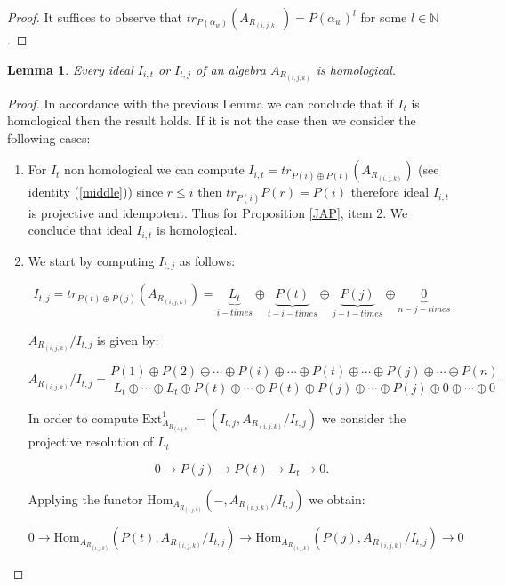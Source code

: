 \documentclass[10pt,twoside]{article}
\newtheorem{lema}{Lemma}
\theoremstyle{definition}
\begin{document}
\begin{proof}
It suffices to observe that $tr_{P(\alpha_w)}(A_{R_{(i, j, k)}})=P(\alpha_w)^{l}$ for some $l\in \mathbb{N}$.
\end{proof}



\begin{lema}\label{18}
Every ideal $I_{i, t}$ or $I_{t, j}$ of an algebra $A_{R_{(i, j, k)}}$ is homological.
\end{lema}

\begin{proof}
In accordance with the previous Lemma we can conclude that if $I_t$ is homological then the result holds. If it is not the case then we consider the following cases:

\begin{enumerate}
\item For $I_{t}$ non homological we can compute  $I_{i,t}= tr_{P(i)\oplus P(t)}(A_{R_{(i, j, k)}})$ (see identity (\ref{middle})) since  $r\leq i$ then $tr_{P(i)}P(r)=P(i)$ therefore ideal  $I_{i,t}$ is projective and idempotent. Thus for Proposition \ref{JAP}, item 2. We conclude that ideal  $I_{i,t}$ is homological.
\item  We start by computing $I_{t,j}$ as follows:

\[I_{t,j}=tr_{P(t)\oplus P(j)}(A_{R_{(i, j, k)}})=\underbrace{L_{t}}_{i- times}\oplus \underbrace{ P(t)}_{t-i-times}\oplus \underbrace{P(j)}_{j-t-times} \oplus\underbrace{0}_{n-j-times}  \]

 $A_{R_{(i, j, k)}}/I_{t, j}$ is given by:

\[A_{R_{(i, j, k)}}/I_{t, j}= \frac{P(1)\oplus P(2) \oplus \cdots \oplus P(i)\oplus \cdots \oplus P(t) \oplus \cdots \oplus P(j)\oplus \cdots \oplus P(n)}{L_t \oplus \cdots \oplus L_t\oplus P(t) \oplus \cdots  \oplus P(t)\oplus P(j) \oplus \cdots \oplus P(j)\oplus 0 \oplus \cdots \oplus 0}\]

In order to compute $\textrm{Ext}^{1}_{A_{R_{(i, j, k)}}}=(I_{t, j},A_{R_{(i,j,k)}}/I_{t, j})$ we consider the projective resolution of $L_t$

\[
0 \to P(j) \to P(t) \to L_t \to 0.
\]

Applying the functor $ \textrm{Hom}_{A_{R_{(i, j, k)}}}(-,A_{R_{(i, j, k)}}/I_{t, j})$ we obtain:

\[
0 \to  \textrm{Hom}_{A_{R_{(i, j, k)}}}(P(t),A_{R_{(i, j, k)}}/I_{t, j}) \to \textrm{Hom}_{A_{R_{(i, j, k)}}}(P(j),A_{R_{(i, j, k)}}/I_{t, j}) \to 0
\]


\end{enumerate}
\end{proof}
\end{document}
